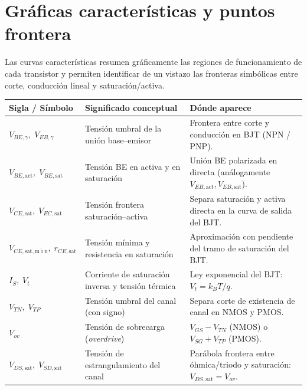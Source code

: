 \documentclass[11pt,a4paper]{article}
\begin{document}
	\section{Gráficas características y puntos frontera}

	Las curvas características resumen gráficamente las regiones de funcionamiento de cada transistor y permiten identificar de un vistazo las fronteras simbólicas entre corte, conducción lineal y saturación/activa.

	\begin{table}[H]
		\centering
		\footnotesize
		\begin{tabularx}{\textwidth}{@{}>{\raggedright\arraybackslash}p{3.4cm} >{\raggedright\arraybackslash}p{4.6cm} >{\raggedright\arraybackslash}X@{}}
			\toprule
			\rowcolor{mainblue!15}
			\textbf{Sigla / Símbolo} & \textbf{Significado conceptual} & \textbf{Dónde aparece} \\
			\midrule
			$V_{BE,\gamma},\; V_{EB,\gamma}$ & Tensión umbral de la unión base--emisor & Frontera entre corte y conducción en BJT (NPN / PNP). \\
			$V_{BE,\mathrm{act}},\; V_{BE,\mathrm{sat}}$ & Tensión BE en activa y en saturación & Unión BE polarizada en directa (análogamente $V_{EB,\mathrm{act}}, V_{EB,\mathrm{sat}}$). \\
			$V_{CE,\mathrm{sat}},\; V_{EC,\mathrm{sat}}$ & Tensión frontera saturación--activa & Separa saturación y activa directa en la curva de salida del BJT. \\
			$V_{CE,\mathrm{sat,m\acute{\imath}n}},\; r_{CE,\mathrm{sat}}$ & Tensión mínima y resistencia en saturación & Aproximación con pendiente del tramo de saturación del BJT. \\
			$I_S,\; V_t$ & Corriente de saturación inversa y tensión térmica & Ley exponencial del BJT: $V_t = k_B T / q$. \\
			$V_{TN},\; V_{TP}$ & Tensión umbral del canal (con signo) & Separa corte de existencia de canal en NMOS y PMOS. \\
			$V_{ov}$ & Tensión de sobrecarga (\emph{overdrive}) & $V_{GS} - V_{TN}$ (NMOS) o $V_{SG} + V_{TP}$ (PMOS). \\
			$V_{DS,\mathrm{sat}},\; V_{SD,\mathrm{sat}}$ & Tensión de estrangulamiento del canal & Parábola frontera entre óhmica/triodo y saturación: $V_{DS,\mathrm{sat}} = V_{ov}$. \\

\end{tabularx}
\end{table}
\end{document}
